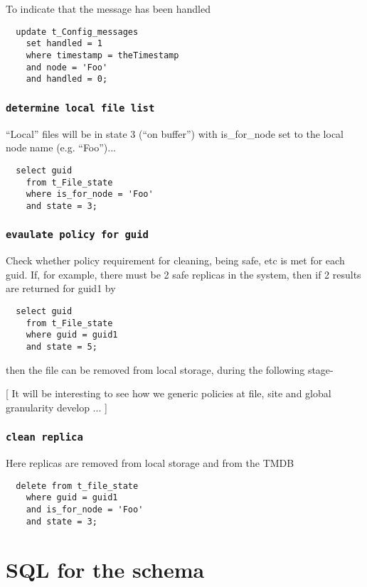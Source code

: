 \documentclass{cmspaper}
\begin{document}
To indicate that the message has been handled

{\small\begin{verbatim}
  update t_Config_messages
  	set handled = 1
  	where timestamp = theTimestamp
  	and node = 'Foo'
  	and handled = 0;
\end{verbatim}}

\subsubsection{\textbf{\texttt{determine local file list}}}
``Local'' files will be in state 3 (``on buffer'') with is\_for\_node set to the local node name (e.g. ``Foo'')...

{\small\begin{verbatim}
  select guid
  	from t_File_state
  	where is_for_node = 'Foo'
  	and state = 3;
\end{verbatim}}

\subsubsection{\textbf{\texttt{evaulate policy for guid}}}
Check whether policy requirement for cleaning, being safe, etc is met for each guid. If, for example, there must be 2 safe replicas in the system, then if 2 results are returned for guid1 by

{\small\begin{verbatim}
  select guid
  	from t_File_state
  	where guid = guid1
  	and state = 5;
\end{verbatim}}

then the file can be removed from local storage, during the following stage-

[ It will be interesting to see how we generic policies at file, site and global granularity develop ... ]

\subsubsection{\textbf{\texttt{clean replica}}}
Here replicas are removed from local storage and from the TMDB

{\small\begin{verbatim}
  delete from t_file_state
    where guid = guid1
    and is_for_node = 'Foo'
    and state = 3;
\end{verbatim}}

\section{SQL for the schema}
\end{document}
